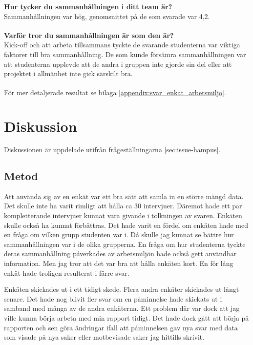 \textbf{Hur tycker du sammanhållningen i ditt team är?}\\
Sammanhållningen var hög, genomsnittet på de som svarade var 4,2.\\\\
\textbf{Varför tror du sammanhållningen är som den är?}\\
Kick-off och att arbeta tillsammans tyckte de svarande studenterna var viktiga faktorer till bra sammanhållning. De som kunde försämra sammanhållningen var att studenterna upplevde att de andra i gruppen inte gjorde sin del eller att projektet i allmänhet inte gick särskilt bra.\\\\
För mer detaljerade resultat se bilaga \ref{appendix:svar_enkat_arbetsmiljo}.

\section{Diskussion}
\label{sec:discussion-hampus}
Diskussionen är uppdelade utifrån frågeställningarna \ref{sec:issue-hampus}.

\subsection{Metod}
Att använda sig av en enkät var ett bra sätt att samla in en större mängd data. Det skulle inte ha varit rimligt att hålla ca 30 intervjuer. Däremot hade ett par kompletterande intervjuer kunnat vara givande i tolkningen av svaren. Enkäten skulle också ha kunnat förbättras. Det hade varit en fördel om enkäten hade med en fråga om vilken grupp studenten var i. Då skulle jag kunnat se bättre hur sammanhållningen var i de olika grupperna. En fråga om hur studenterna tyckte deras sammanhållning påverkades av arbetsmiljön hade också gett användbar information.	Men jag tror att det var bra att hålla enkäten kort. En för lång enkät hade troligen resulterat i färre svar. 

Enkäten skickades ut i ett tidigt skede. Flera andra enkäter skickades ut långt senare. Det hade nog blivit fler svar om en påminnelse hade skickats ut i samband med många av de andra enkäterna. Ett problem där var dock att jag ville kunna börja arbeta med min rapport tidigt. Det hade dock gått att börja på rapporten och sen göra ändringar ifall att påminnelsen gav nya svar med data som visade på nya saker eller motbevisade saker jag hittills skrivit. 

